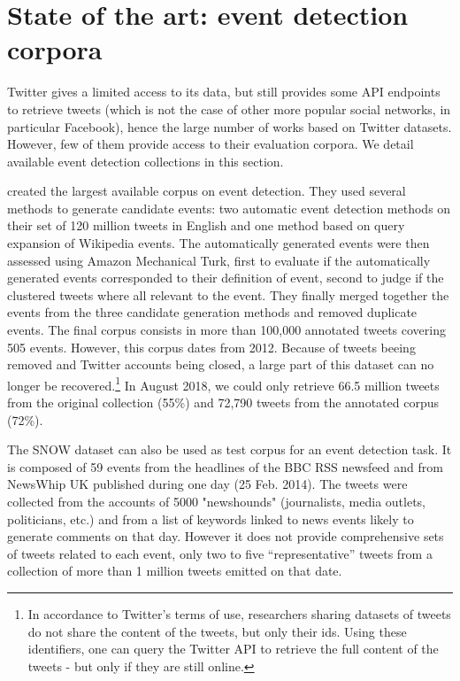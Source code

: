 \section{State of the art: event detection corpora}
\label{state of the art}

Twitter gives a limited access to its data, but still provides some API endpoints to retrieve tweets (which is not the case of other more popular social networks, in particular Facebook), hence the large number of works based on Twitter datasets. However, few of them provide access to their evaluation corpora. We detail available event detection collections in this section.

\citet{mcminn_building_2013} created the largest available corpus on event detection. They used several methods to generate candidate events: two automatic event detection methods on their set of 120 million tweets in English and one method based on query expansion of Wikipedia events. The automatically generated events were then assessed using Amazon Mechanical Turk, first to evaluate if the automatically generated events corresponded to their definition of event, second to judge if the clustered tweets where all relevant to the event. They finally merged together the events from the three candidate generation methods and removed duplicate events. The final corpus consists in more than 100,000 annotated tweets covering 505 events. However, this corpus dates from 2012.
Because of tweets beeing removed and Twitter accounts being closed, a large part of this dataset can no longer be recovered.\footnote{
In accordance to Twitter’s terms of use, researchers sharing datasets of tweets do not share the content of the tweets,
but only their ids. Using these identifiers, one can query the Twitter API to retrieve the full content of the tweets - but only if they are still online.
} In August 2018, we could only retrieve 66.5 million tweets from the original collection (55\%) and 72,790 tweets from  the annotated corpus (72\%).

The SNOW dataset \citep{papadopoulos_snow_2014} can also be used as test corpus for an event detection task. It is composed of 59 events from the headlines of the BBC RSS newsfeed and from NewsWhip UK published during one day (25 Feb. 2014). The tweets were collected from the accounts of 5000 "newshounds" (journalists, media outlets, politicians, etc.) and from a list of keywords linked to news events likely to generate comments on that day.  However it does not provide comprehensive sets of tweets related to each event, only two to five “representative” tweets from a collection of more than 1 million tweets emitted on that date.

